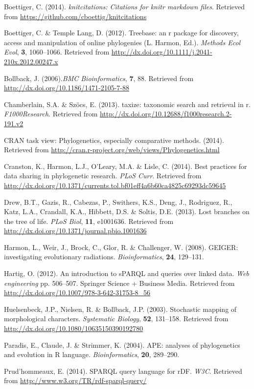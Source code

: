 \documentclass[author-year, review, 11pt]{components/elsarticle} %
\begin{document}
Boettiger, C. (2014). \emph{knitcitations: Citations for knitr markdown
files}. Retrieved from \url{https://github.com/cboettig/knitcitations}

Boettiger, C. \& {Temple Lang}, D. (2012). Treebase: an r package for
discovery, access and manipulation of online phylogenies (L. Harmon,
Ed.). \emph{Methods Ecol Evol}, \textbf{3}, 1060--1066. Retrieved from
\url{http://dx.doi.org/10.1111/j.2041-210x.2012.00247.x}

Bollback, J. (2006).\emph{BMC Bioinformatics}, \textbf{7}, 88. Retrieved
from \url{http://dx.doi.org/10.1186/1471-2105-7-88}

Chamberlain, S.A. \& Sz{ö}cs, E. (2013). taxize: taxonomic search and
retrieval in r. \emph{F1000Research}. Retrieved from
\url{http://dx.doi.org/10.12688/f1000research.2-191.v2}

CRAN task view: Phylogenetics, especially comparative methods. (2014).
Retrieved from
\url{http://cran.r-project.org/web/views/Phylogenetics.html}

Cranston, K., Harmon, L.J., O'Leary, M.A. \& Lisle, C. (2014). Best
practices for data sharing in phylogenetic research. \emph{PLoS Curr}.
Retrieved from
\url{http://dx.doi.org/10.1371/currents.tol.bf01eff4a6b60ca4825c69293dc59645}

Drew, B.T., Gazis, R., Cabezas, P., Swithers, K.S., Deng, J., Rodriguez,
R., Katz, L.A., Crandall, K.A., Hibbett, D.S. \& Soltis, D.E. (2013).
Lost branches on the tree of life. \emph{PLoS Biol}, \textbf{11},
e1001636. Retrieved from
\url{http://dx.doi.org/10.1371/journal.pbio.1001636}

Harmon, L., Weir, J., Brock, C., Glor, R. \& Challenger, W. (2008).
GEIGER: investigating evolutionary radiations. \emph{Bioinformatics},
\textbf{24}, 129--131.

Hartig, O. (2012). An introduction to sPARQL and queries over linked
data. \emph{Web engineering} pp. 506--507. Springer Science + Business
Media. Retrieved from
\url{http://dx.doi.org/10.1007/978-3-642-31753-8_56}

Huelsenbeck, J.P., Nielsen, R. \& Bollback, J.P. (2003). Stochastic
mapping of morphological characters. \emph{Systematic Biology},
\textbf{52}, 131--158. Retrieved from
\url{http://dx.doi.org/10.1080/10635150390192780}

Paradis, E., Claude, J. \& Strimmer, K. (2004). APE: analyses of
phylogenetics and evolution in R language. \emph{Bioinformatics},
\textbf{20}, 289--290.

Prud'hommeaux, E. (2014). SPARQL query language for rDF. \emph{W3C}.
Retrieved from \url{http://www.w3.org/TR/rdf-sparql-query/}
\end{document}
